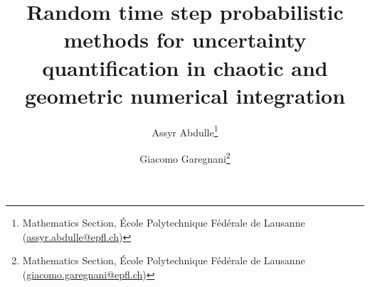 \usepackage[T1]{fontenc}
\usepackage{lmodern}
\usepackage[utf8x]{inputenx}
\usepackage{microtype}
\usepackage{framed}
\usepackage{listings}
\usepackage{vmargin}
\usepackage{setspace}
\usepackage{mathrsfs, mathenv}
\usepackage{amsmath, amsthm, amssymb, amsfonts, amscd}
\usepackage{graphicx}
\usepackage{epstopdf}
\usepackage[svgnames]{xcolor}
\usepackage{hyperref}
\usepackage[capitalise]{cleveref}
\usepackage{xparse}
\hypersetup{citecolor=blue, colorlinks=true, linkcolor=black}
\setlength{\parskip}{6pt}
\setlength\parindent{0pt}
\usepackage{subcaption}
\usepackage{bbm}
\usepackage{cite}
\usepackage{verbatim}
\usepackage{pgfplots}
\usepackage{tikz}
\usepackage{color}
\usepackage{stmaryrd}
\usepackage{autonum}

\theoremstyle{plain}
\newtheorem{theorem}{Theorem}
\newtheorem{corollary}{Corollary}
\newtheorem{lemma}{Lemma}
\newtheorem{proposition}{Proposition}

\theoremstyle{definition}
\newtheorem{definition}{Definition}

\theoremstyle{remark}
\newtheorem{remark}{Remark}
\newtheorem{assumption}{Assumption}
\newtheorem{example}{Example}


\ifpdf
\else
\fi

\usepackage{mathtools}


\usepackage{booktabs}

\usepackage{pgfplots}
\usepackage{tikz}
\usetikzlibrary{arrows,decorations.pathmorphing,backgrounds,positioning,fit,matrix}
\usepackage[labelfont=bf]{caption}
\setlength{\belowcaptionskip}{-5pt}
\usepackage{here}
\usepackage[font=normal]{subcaption}

\usepackage{enumitem}

\newcommand{\creflastconjunction}{, and~}


\newcommand{\email}[1]{\href{#1}{#1}}
\newcommand{\TheTitle}{Random time step probabilistic methods for uncertainty quantification in chaotic and geometric numerical integration} 
\newcommand{\TheAuthors}{A. Abdulle, G. Garegnani}
\title{{\TheTitle}}
\author{Assyr Abdulle\thanks{Mathematics Section, \'Ecole Polytechnique F\'ed\'erale de Lausanne (\email{assyr.abdulle@epfl.ch})}
	\and
	Giacomo Garegnani\thanks{Mathematics Section, \'Ecole Polytechnique F\'ed\'erale de Lausanne (\email{giacomo.garegnani@epfl.ch})}}
\date{}

